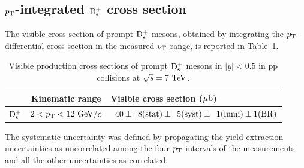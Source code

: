 \subsection{$p_{\rm T}$-integrated ${\rm D_s^+}$ cross section}
\label{sec:ppDsXsecPtint}
The visible cross section of prompt ${\rm D_s^+}$ mesons, obtained by integrating
the $p_{\rm T}$-differential cross section in the measured $p_{\rm T}$ range, is reported
in Table~\ref{tab:ptintegcs}.
\begin{table}[!h]
\centering
\begin{tabular}{c|c|l} 
 & Kinematic range & Visible cross section ($\mathrm{\mu b}$) \\
\hline
\rule{0pt}{12pt} 
${\rm D_s^+}$     & $2<p_{\rm T}<12~\mathrm{GeV}/c$ & $\phantom{0}40 \pm \phantom{0}8 ({\rm stat}) \pm \phantom{0}5 ({\rm syst}) \pm \phantom{0}1 ({\rm lumi}) \pm 1 ({\rm BR})$\\[1ex]
\hline
\end{tabular}
\caption{Visible production cross sections of prompt ${\rm D_s^+}$ mesons in $|y| < 0.5$ in pp collisions at $\sqrt{s} = 7~\mathrm{TeV}$.}
\label{tab:ptintegcs}
\end{table}
The systematic uncertainty was defined by propagating the yield extraction 
uncertainties as uncorrelated among the four $p_{\rm T}$ intervals of the measurements and all the other uncertainties 
as correlated.

